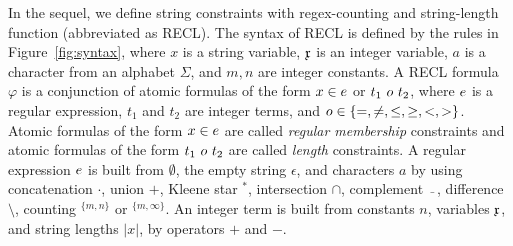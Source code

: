 %

In the sequel, we define string constraints with regex-counting and string-length function (abbreviated as RECL). The syntax of RECL is defined by the rules in Figure~\ref{fig:syntax}, where $x$ is a string variable, $\mathfrak{x}$ is an integer variable, $a$ is a character from an alphabet $\Sigma$, and $m, n$ are integer constants. 
A RECL formula $\varphi$ is a conjunction of atomic formulas of the form $x \in e$ or $t_1\ o\ t_2$, where $e$ is a regular expression,  
$t_1$ and $t_2$ are integer terms, and $o \in \{=, \neq, \le, \ge, <, >\}$. Atomic formulas of the form $x \in e$ are called \emph{regular membership} constraints and atomic formulas of the form $t_1\ o\ t_2$ are called \emph{length} constraints. 
%
A regular expression $e$ is built from $\emptyset$, the empty string $\epsilon$, and characters $a$ by using concatenation  $\cdot$, union $+$, Kleene star $^*$, intersection $\cap$, complement $\bar{\mbox{ }}$, difference $\setminus$, counting $^{\{m,n\}}$ or $^{\{m,\infty\}}$. An integer term is built from constants $n$, variables $\mathfrak{x}$, and string lengths $|x|$, by operators $+$ and $-$.
% 
